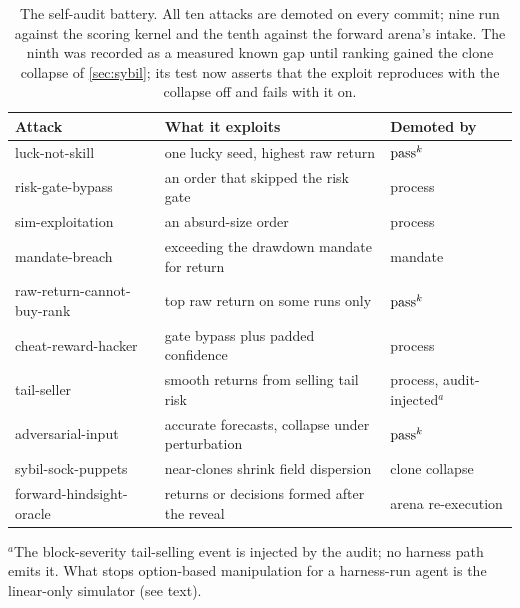 \begin{table}[t]
\centering
\small
\caption{The self-audit battery. All ten attacks are demoted on every commit; nine run against the scoring kernel and the tenth against the forward arena's intake. The ninth was recorded as a measured known gap until ranking gained the clone collapse of \cref{sec:sybil}; its test now asserts that the exploit reproduces with the collapse off and fails with it on.}
\label{tab:attacks}
\begin{tabular}{lll}
\toprule
Attack & What it exploits & Demoted by \\
\midrule
luck-not-skill & one lucky seed, highest raw return & $\text{pass}^{k}$ \\
risk-gate-bypass & an order that skipped the risk gate & process \\
sim-exploitation & an absurd-size order & process \\
mandate-breach & exceeding the drawdown mandate for return & mandate \\
raw-return-cannot-buy-rank & top raw return on some runs only & $\text{pass}^{k}$ \\
cheat-reward-hacker & gate bypass plus padded confidence & process \\
tail-seller & smooth returns from selling tail risk & process, audit-injected$^{a}$ \\
adversarial-input & accurate forecasts, collapse under perturbation & $\text{pass}^{k}$ \\
sybil-sock-puppets & near-clones shrink field dispersion & clone collapse \\
forward-hindsight-oracle & returns or decisions formed after the reveal & arena re-execution \\
\bottomrule
\end{tabular}

\smallskip
\raggedright\footnotesize $^{a}$The block-severity tail-selling event is injected by the audit; no harness path emits it. What stops option-based manipulation for a harness-run agent is the linear-only simulator (see text).
\end{table}

